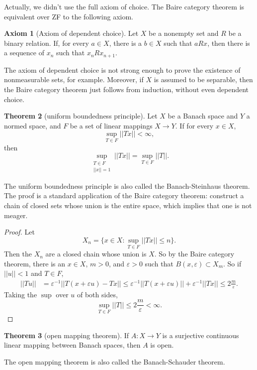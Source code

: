 \documentclass[12pt]{report}
\theoremstyle{definition}
\newtheorem{theorem}{Theorem}[chapter]
\newtheorem{axiom}[theorem]{Axiom}
\begin{document}
Actually, we didn't use the full axiom of choice. The Baire category theorem is equivalent over ZF to the following axiom.
\begin{axiom}[Axiom of dependent choice]
    Let $X$ be a nonempty set and $R$ be a binary relation. If, for every $a \in X$, there is a $b \in X$ such that $aRx$, then there is a sequence of $x_n$ such that $x_nRx_{n+1}$.
\end{axiom}
The axiom of dependent choice is not strong enough to prove the existence of nonmeasurable sets, for example. Moreover, if $X$ is assumed to be separable, then the Baire category theorem just follows from induction, without even dependent choice.

\begin{theorem}[uniform boundedness principle]
    Let $X$ be a Banach space and $Y$ a normed space, and $F$ be a set of linear mappings $X \to Y$. If for every $x \in X$,
    $$\sup_{T \in F} ||Tx|| < \infty,$$
    then
    $$\sup_{\substack{T \in F\\||x|| = 1}} ||Tx|| = \sup_{T \in F} ||T||.$$
\end{theorem}
The uniform boundedness principle is also called the Banach-Steinhaus theorem. The proof is a standard application of the Baire category theorem: construct a chain of closed sets whose union is the entire space, which implies that one is not meager.
\begin{proof}
    Let
    $$X_n = \{x \in X: \sup_{T \in F} ||Tx|| \leq n\}.$$
    Then the $X_n$ are a closed chain whose union is $X$. So by the Baire category theorem, there is an $x \in X$, $m > 0$, and $\varepsilon > 0$ such that $B(x, \varepsilon) \subset X_m$. So if $||u|| < 1$ and $T \in F$,
\begin{align*}
    ||Tu|| &= \varepsilon^{-1} ||T(x + \varepsilon u) - Tx||
        \leq \varepsilon^{-1} ||T(x + \varepsilon u)|| + \varepsilon^{-1} ||Tx||
        \leq 2\frac{m}{\varepsilon}.
\end{align*}
    Taking the $\sup$ over $u$ of both sides,
    $$\sup_{T \in F} ||T|| \leq 2\frac{m}{\varepsilon} < \infty.$$
\end{proof}
\begin{theorem}[open mapping theorem]
    If $A: X \to Y$ is a surjective continuous linear mapping between Banach spaces, then $A$ is open.
\end{theorem}
The open mapping theorem is also called the Banach-Schauder theorem.
\end{document}
